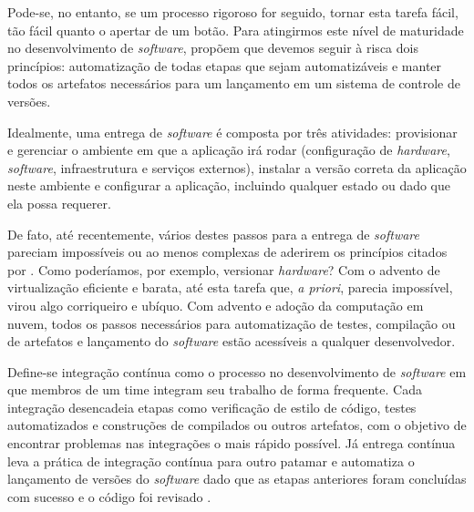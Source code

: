  Pode-se, no entanto, se um processo rigoroso for seguido,  
  tornar esta tarefa fácil, tão fácil quanto o apertar de um botão.
  Para atingirmos este nível de maturidade no desenvolvimento de 
  \emph{software},  propõem que
  devemos seguir à risca dois princípios: automatização de todas etapas que sejam 
  automatizáveis e manter todos os artefatos necessários para um lançamento em um sistema de 
  controle de versões. 

  Idealmente, uma entrega de \emph{software} é composta por três atividades: 
  provisionar e gerenciar o ambiente em que a aplicação irá rodar (configuração de \emph{hardware},
  \emph{software}, infraestrutura e serviços externos), instalar a versão correta da aplicação 
  neste ambiente e configurar a aplicação, incluindo qualquer estado ou dado que ela possa requerer.

  De fato, até recentemente, vários destes passos para a entrega de \emph{software} pareciam 
  impossíveis ou ao menos complexas de aderirem os princípios citados por 
  . Como poderíamos, por exemplo, 
  versionar \emph{hardware}? Com o advento de virtualização eficiente e barata, até esta 
  tarefa que, \emph{a priori}, parecia impossível, virou algo corriqueiro e ubíquo. 
  Com advento e adoção da computação em nuvem, todos os passos necessários para automatização 
  de testes, compilação ou de artefatos e lançamento do \emph{software} estão 
  acessíveis a qualquer desenvolvedor.

  Define-se integração contínua como o processo no desenvolvimento de \emph{software} em que 
  membros de um time integram seu trabalho de forma frequente. Cada integração desencadeia etapas 
  como verificação de estilo de código, testes automatizados e construções de compilados ou 
  outros artefatos, com o objetivo de encontrar problemas nas integrações o mais rápido possível.
  Já entrega contínua leva a prática de integração contínua para outro patamar e automatiza 
  o lançamento de versões do \emph{software} dado que as etapas anteriores foram concluídas com 
  sucesso e o código foi revisado \cite{fowler2006continuous}.
